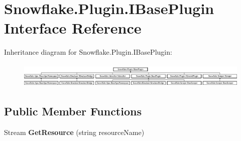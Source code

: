 \hypertarget{interface_snowflake_1_1_plugin_1_1_i_base_plugin}{}\section{Snowflake.\+Plugin.\+I\+Base\+Plugin Interface Reference}
\label{interface_snowflake_1_1_plugin_1_1_i_base_plugin}
Inheritance diagram for Snowflake.\+Plugin.\+I\+Base\+Plugin\+:\begin{figure}[H]
\begin{center}
\leavevmode
\includegraphics[height=1.201717cm]{interface_snowflake_1_1_plugin_1_1_i_base_plugin}
\end{center}
\end{figure}
\subsection*{Public Member Functions}
\begin{DoxyCompactItemize}
\item 
\hypertarget{interface_snowflake_1_1_plugin_1_1_i_base_plugin_aa1feaad7a3b4ce6fd82bfd180e99a876}{}Stream {\bfseries Get\+Resource} (string resource\+Name)\label{interface_snowflake_1_1_plugin_1_1_i_base_plugin_aa1feaad7a3b4ce6fd82bfd180e99a876}

\end{DoxyCompactItemize}
